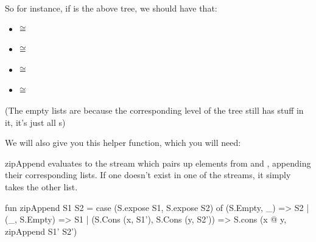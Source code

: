 So for instance, if  is the above tree, we should have that:
\begin{itemize}
  \item {} $\cong$ 
  \item {} $\cong$ 
  \item {} $\cong$ 
  \item {} $\cong$ 
\end{itemize}

(The empty lists are because the corresponding level of the tree still has stuff
in it, it's just all s)

\newpage

We will also give you this helper function, which you will need:

\spec
  {zipAppend}
  {{\small{}}}
  {}
  { evaluates to the stream which pairs up elements from
   and , appending their corresponding lists. If one doesn't
  exist in one of the streams, it simply takes the other list.}

\begin{codeblock}
  fun zipAppend S1 S2 =
    case (S.expose S1, S.expose S2) of
      (S.Empty, _) => S2
    | (_, S.Empty) => S1
    | (S.Cons (x, S1'), S.Cons (y, S2')) =>
        S.cons (x @ y, zipAppend S1' S2')
\end{codeblock}

